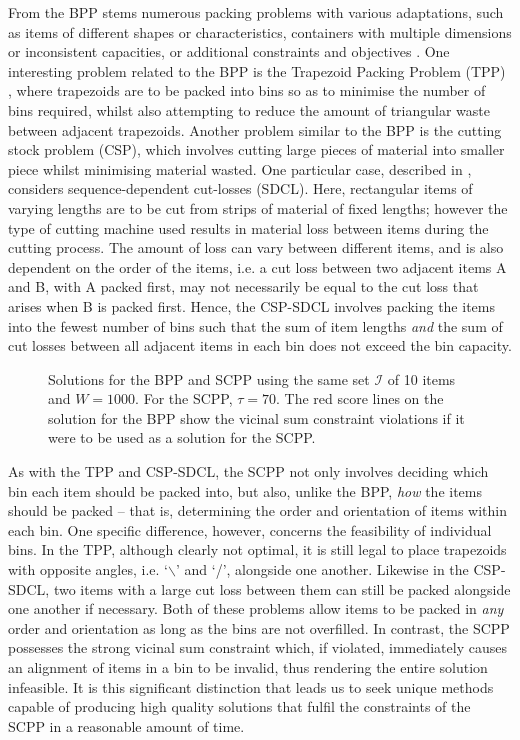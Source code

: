\documentclass{IEEEtran}
\begin{document}
From the BPP stems numerous packing problems with various adaptations, such as items of different shapes or characteristics, containers with multiple dimensions or inconsistent capacities, or additional constraints and objectives \cite{haouari2009, kenmochi2009, xavier2008}. One interesting problem related to the BPP is the Trapezoid Packing Problem (TPP) \cite{lewis2011, lewis2017}, where trapezoids are to be packed into bins so as to minimise the number of bins required, whilst also attempting to reduce the amount of triangular waste between adjacent trapezoids. Another problem similar to the BPP is the cutting stock problem (CSP), which involves cutting large pieces of material into smaller piece whilst minimising material wasted. One particular case, described in \cite{garraffa2016}, considers sequence-dependent cut-losses (SDCL). Here, rectangular items of varying lengths are to be cut from strips of material of fixed lengths; however the type of cutting machine used results in material loss between items during the cutting process. The amount of loss can vary between different items, and is also dependent on the order of the items, i.e. a cut loss between two adjacent items A and B, with A packed first, may not necessarily be equal to the cut loss that arises when B is packed first. Hence, the CSP-SDCL involves packing the items into the fewest number of bins such that the sum of item lengths \emph{and} the sum of cut losses between all adjacent items in each bin does not exceed the bin capacity.
\begin{figure}[h]
	\centering	
	\subfloat[BPP]{
		\label{fig:bpp}}
	\vspace{0.5mm}
	\subfloat[SCPP]{
		\label{fig:scpp}}
	\caption{Solutions for the BPP and SCPP using the same set $\mathcal{I}$ of 10 items and $W = 1000$. For the SCPP, $\tau = 70$. The red score lines on the solution for the BPP show the vicinal sum constraint violations if it were to be used as a solution for the SCPP.}	
	\label{fig:bppvscpp}
\end{figure}

\noindent As with the TPP and CSP-SDCL, the SCPP not only involves deciding which bin each item should be packed into, but also, unlike the BPP, \emph{how} the items should be packed -- that is, determining the order and orientation of items within each bin. One specific difference, however, concerns the feasibility of individual bins. In the TPP, although clearly not optimal, it is still legal to place trapezoids with opposite angles, i.e. `$\backslash$' and `/', alongside one another. Likewise in the CSP-SDCL, two items with a large cut loss between them can still be packed alongside one another if necessary. Both of these problems allow items to be packed in \emph{any} order and orientation as long as the bins are not overfilled. In contrast, the SCPP possesses the strong vicinal sum constraint which, if violated, immediately causes an alignment of items in a bin to be invalid, thus rendering the entire solution infeasible. It is this significant distinction that leads us to seek unique methods capable of producing high quality solutions that fulfil the constraints of the SCPP in a reasonable amount of time.
\end{document}
